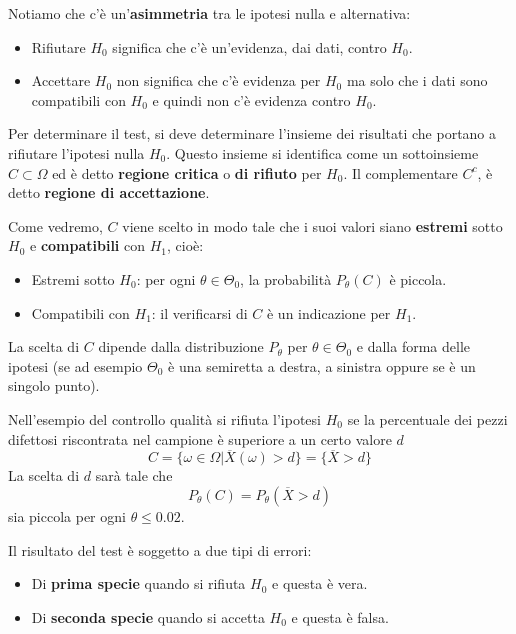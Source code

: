\begin{observation}
	Notiamo che c'è un'\textbf{asimmetria} tra le ipotesi nulla e alternativa:
	\begin{itemize}
		\item Rifiutare $H_0$ significa che c'è un'evidenza, dai dati, contro $H_0$.
		\item Accettare $H_0$ non significa che c'è evidenza per $H_0$ ma solo che i dati sono
		      compatibili con $H_0$ e quindi non c'è evidenza contro $H_0$.
	\end{itemize}
\end{observation}

Per determinare il test, si deve determinare l'insieme dei risultati che portano a rifiutare
l'ipotesi nulla $H_0$. Questo insieme si identifica come un sottoinsieme $C \subset \Omega$ ed è
detto \textbf{regione critica} o \textbf{di rifiuto} per $H_0$. Il complementare $C^c$, è detto
\textbf{regione di accettazione}.

Come vedremo, $C$ viene scelto in modo tale che i suoi valori siano \textbf{estremi} sotto $H_0$ e
\textbf{compatibili} con $H_1$, cioè:
\begin{itemize}
	\item Estremi sotto $H_0$: per ogni $\theta \in \Theta_0$, la probabilità $P_\theta (C)$ è
	      piccola.
	\item Compatibili con $H_1$: il verificarsi di $C$ è un indicazione per $H_1$.
\end{itemize}
La scelta di $C$ dipende dalla distribuzione $P_\theta$ per $\theta \in \Theta_0$ e dalla forma
delle ipotesi (se ad esempio $\Theta_0$ è una semiretta a destra, a sinistra oppure se è un singolo
punto).

\begin{example}
	Nell'esempio del controllo qualità si rifiuta l'ipotesi $H_0$ se la percentuale dei pezzi
	difettosi riscontrata nel campione è superiore a un certo valore $d$
	\[ C = \{ \omega \in \Omega | \overline{X}(\omega) > d \} = \{ \overline{X} > d \} \]
	La scelta di $d$ sarà tale che
	\[ P_\theta(C) = P_\theta(\overline{X} > d) \]
	sia piccola per ogni $\theta \leq 0.02$.
\end{example}

Il risultato del test è soggetto a due tipi di errori:
\begin{itemize}
	\item Di \textbf{prima specie} quando si rifiuta $H_0$ e questa è vera.
	\item Di \textbf{seconda specie} quando si accetta $H_0$ e questa è falsa.
\end{itemize}

